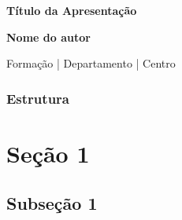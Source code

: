 \documentclass[t]{beamer}
\begin{document}
{
\begin{frame}[plain]
\vspace{18mm}
\begin{flushright}
\textcolor{cinza}{\textbf{\huge{
Título da Apresentação
}}}
\end{flushright}

\vspace{-6mm}
\begin{flushright}
\textcolor{cinza}{\textbf{\scriptsize{
Nome do autor
}}}
\end{flushright}

\vspace{-7mm}
\begin{flushright}
\textcolor{cinza}{\scriptsize{
Formação | Departamento | Centro
}}
\end{flushright}


\end{frame}
}

\begin{frame}
\frametitle{Estrutura}
\tableofcontents
\end{frame}

\section{Seção 1}

\subsection{Subseção 1}
\end{document}

